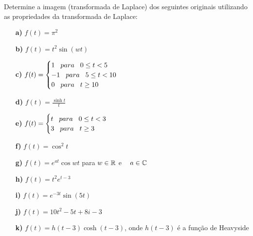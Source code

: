 \linespread{1.5}
Determine a imagem (transformada de Laplace) dos seguintes originais utilizando as propriedades da transformada de Laplace:
\begin{itemize}
    \item[\textbf{a)}] $f(t) = \pi^2$
    \item[\textbf{b)}] $f(t) = t^2\sin{(wt)}$
    \item[\textbf{c)}] $f(t) = \begin{cases} 
    1 \hspace{0.3cm} para \hspace{0.3cm} 0 \leq t < 5\\
    -1 \hspace{0.3cm} para \hspace{0.3cm} 5 \leq t < 10\\
    0 \hspace{0.3cm} para \hspace{0.3cm} t \geq 10
    \end{cases}$
    \item[\textbf{d)}] $f(t) = \frac{\sinh{t}}{t}$
    \item[\textbf{e)}] $f(t) = \begin{cases} 
    t \hspace{0.3cm} para \hspace{0.3cm} 0 \leq t < 3\\
    3 \hspace{0.3cm} para \hspace{0.3cm} t \geq 3
    \end{cases}$
    \item[\textbf{f)}] $f(t) = \cos^2{t}$
    \item[\textbf{g)}] $f(t) = e^{at}\cos{wt}$ para $w \in \mathbb{R} $ e $\hspace{0.3cm} a \in \mathbb{C}$
    \item[\textbf{h)}] $f(t) = t^2e^{t-3}$
    \item[\textbf{i)}] $f(t) = e^{-3t}\sin{(5t)}$
    \item[\textbf{j)}] $f(t) = 10t^2 -5t + 8i - 3$
    \item[\textbf{k)}] $f(t) = h(t-3)\cosh{(t-3)}$, onde $h(t-3)$ é a função de Heavyside
\end{itemize}